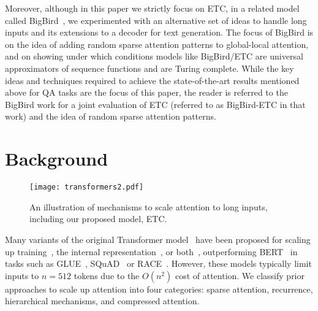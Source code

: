 \documentclass[11pt,a4paper]{article}
\begin{document}
Moreover, although in this paper we strictly focus on ETC, in a related model called BigBird~\cite{zaheer2020big}, we experimented with an alternative set of ideas to handle long inputs and its extensions to a decoder for text generation. The focus of BigBird is on the idea of adding random sparse attention patterns to global-local attention, and on showing under which conditions models like BigBird/ETC are universal approximators of sequence functions and are Turing complete. While the key ideas and techniques required to achieve the state-of-the-art results mentioned above for QA tasks are the focus of this paper, the reader is referred to the BigBird work for a joint evaluation of ETC (referred to as BigBird-ETC in that work) and the idea of random sparse attention patterns.




\section{Background}\label{sec:background}

\begin{figure*}[t!]
	\texttt{[image: transformers2.pdf]}
	\centering
	\caption{An illustration of mechanisms to scale attention to long inputs, including our proposed model, ETC.}
	\label{fig:attention-mechanisms}
\end{figure*}





Many variants of the original Transformer model~\cite{vaswani2017attention} have been proposed for scaling up training~\citep[RoBERTa,][]{liu2019roberta}, the internal representation~\citep[ALBERT,][]{lan2019albert}, or both~\cite[T5,][]{raffel2019exploring}, outperforming BERT~\cite{devlin2018bert} in tasks such as GLUE~\cite{wang2018glue}, SQuAD~\cite{rajpurkar2016squad} or RACE~\cite{lai2017race}. However, these models typically limit inputs to $n=512$ tokens due to the $O(n^2)$ cost of attention. We classify prior approaches to scale up attention into four categories: sparse attention, recurrence, hierarchical mechanisms, and compressed attention.
\end{document}
